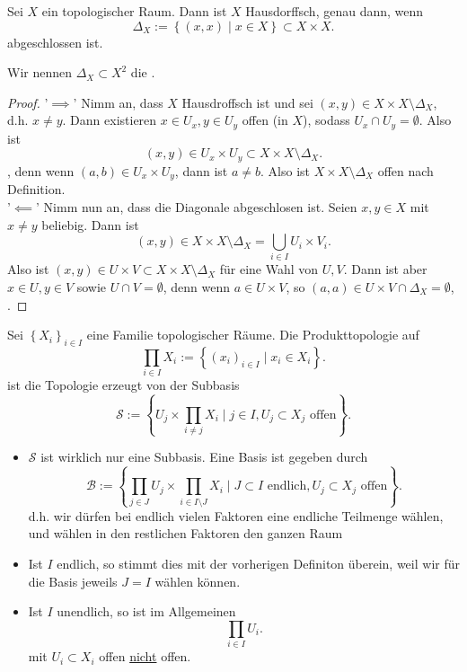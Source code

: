 \begin{theorem}[Diagonaleigenschaft]\label{thm:raum-ist-hausdorff-gdw-diagonale-abgeschlossen}
    Sei $X$ ein topologischer Raum. Dann ist  $X$ Hausdorffsch, genau dann, wenn
     \[
         \Delta_X := \left \{(x,x) \mid  x\in X\right\}  \subset X\times X
    .\] 
    abgeschlossen ist.
\end{theorem}
\begin{notation}
    Wir nennen $\Delta_X\subset X^2$  die .
\end{notation}
\begin{proof}
'$\implies$' Nimm an, dass $X$ Hausdroffsch ist und sei  $(x,y) \in X \times X \setminus \Delta_X$, d.h. $x\neq y$. Dann existieren $x\in U_x,y\in U_y$ offen (in $X$), sodass  $U_x \cap  U_y = \emptyset$. Also ist
    \[
        (x,y)\in     U_x\times U_y \subset X\times X \setminus \Delta_X
    .\] 
    , denn wenn $(a,b) \in U_x \times U_y$, dann ist $a\neq b$. Also ist  $X\times X \setminus \Delta_X$ offen nach Definition. \\
    '$\impliedby$'    Nimm nun an, dass die Diagonale abgeschlosen ist. Seien $x,y\in X$ mit $x\neq y$ beliebig. Dann ist
    \[
        (x,y) \in X\times X \setminus \Delta_X = \bigcup_{i\in I} U_i \times V_i 
    .\] 
    Also ist $(x,y) \in U\times V \subset X\times X\setminus \Delta_X$ für eine Wahl von $U,V$. Dann ist aber  $x\in U, y\in V$ sowie $U\cap V = \emptyset$, denn wenn $a\in U\times V$, so $(a,a) \in U\times V \cap  \Delta_X = \emptyset$, \contra.
\end{proof}
\begin{definition}\label{def:produkt-beliebiger-mengen}
    Sei $\left \{X_i\right\} _{i \in I}$ eine Familie topologischer Räume. Die Produkttopologie auf
    \[
        \prod_{i\in I} X_i := \left \{(x_i)_{i\in I} \mid  x_i \in X_i\right\} 
    .\] 
    ist die Topologie erzeugt von der Subbasis
    \[
    \mathcal{S}  := \left \{U_j \times  \prod_{i\neq j} X_i \mid  j\in I, U_j \subset X_j \text{ offen}\right\} 
    .\] 
\end{definition}
\begin{remark}
    \begin{itemize}
        \item 
    $\mathcal{S}$ ist wirklich nur eine Subbasis. Eine Basis ist gegeben durch
    \[
        \mathcal{B} := \left \{\prod_{j\in J} U_j \times \prod_{i\in I \setminus J} X_i \mid  J\subset I \text{ endlich}, U_j \subset X_j \text{ offen}\right\} 
    .\] 
    d.h. wir dürfen bei endlich vielen Faktoren eine endliche Teilmenge wählen, und wählen in den restlichen Faktoren den ganzen Raum
\item Ist $I$ endlich, so stimmt dies mit der vorherigen Definiton überein, weil wir für die Basis jeweils  $J = I$ wählen können.
\item \Warning Ist  $I$ unendlich, so ist im Allgemeinen
     \[
    \prod_{i\in I} U_i
    .\] 
    mit $U_i \subset X_i$ offen \underline{nicht} offen. 
    \end{itemize}
\end{remark}
